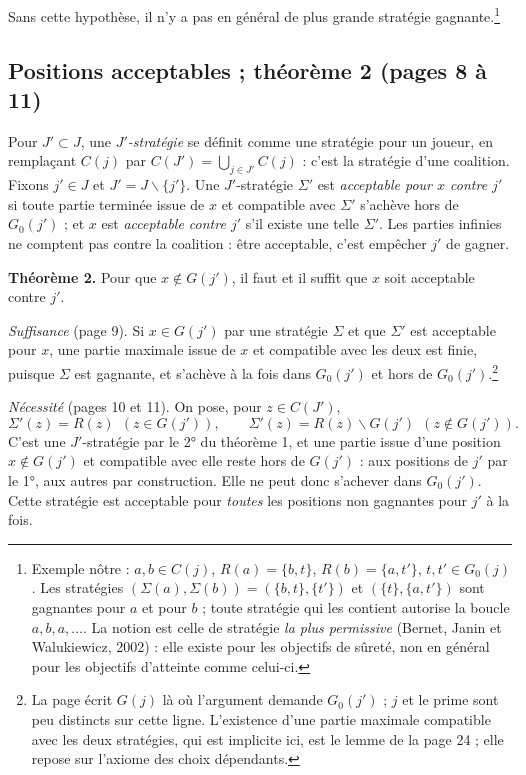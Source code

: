 \documentclass[11pt,a4paper]{article}
\begin{document}
Sans cette hypothèse, il n'y a pas en général de plus grande stratégie
gagnante.\footnote{Exemple nôtre : $a, b \in C(j)$, $R(a) = \{b, t\}$,
$R(b) = \{a, t'\}$, $t, t' \in G_0(j)$. Les stratégies
$(\Sigma(a), \Sigma(b)) = (\{b, t\}, \{t'\})$ et $(\{t\}, \{a, t'\})$ sont
gagnantes pour $a$ et pour $b$ ; toute stratégie qui les contient autorise la
boucle $a, b, a, \ldots$. La notion est celle de stratégie \emph{la plus
permissive} (Bernet, Janin et Walukiewicz, 2002) : elle existe pour les
objectifs de sûreté, non en général pour les objectifs d'atteinte comme
celui-ci.}

\subsection*{Positions acceptables ; théorème 2 (pages 8 à 11)}

Pour $J' \subset J$, une \emph{$J'$-stratégie} se définit comme une stratégie
pour un joueur, en remplaçant $C(j)$ par $C(J') = \bigcup_{j \in J'} C(j)$ :
c'est la stratégie d'une coalition. Fixons $j' \in J$ et
$J' = J \smallsetminus \{j'\}$. Une $J'$-stratégie $\Sigma'$ est
\emph{acceptable pour $x$ contre $j'$} si toute partie terminée issue de $x$
et compatible avec $\Sigma'$ s'achève hors de $G_0(j')$ ; et $x$ est
\emph{acceptable contre $j'$} s'il existe une telle $\Sigma'$. Les parties
infinies ne comptent pas contre la coalition : être acceptable, c'est
empêcher $j'$ de gagner.

\textbf{Théorème 2.} Pour que $x \notin G(j')$, il faut et il suffit que $x$
soit acceptable contre $j'$.

\emph{Suffisance} (page 9). Si $x \in G(j')$ par une stratégie $\Sigma$ et
que $\Sigma'$ est acceptable pour $x$, une partie maximale issue de $x$ et
compatible avec les deux est finie, puisque $\Sigma$ est gagnante, et
s'achève à la fois dans $G_0(j')$ et hors de $G_0(j')$.\footnote{La page écrit
$G(j)$ là où l'argument demande $G_0(j')$ ; $j$ et le prime sont peu
distincts sur cette ligne. L'existence d'une partie maximale compatible avec
les deux stratégies, qui est implicite ici, est le lemme de la page 24 ; elle
repose sur l'axiome des choix dépendants.}

\emph{Nécessité} (pages 10 et 11). On pose, pour $z \in C(J')$,
\[
\Sigma'(z) = R(z) \ \ (z \in G(j')),
\qquad
\Sigma'(z) = R(z) \smallsetminus G(j') \ \ (z \notin G(j')).
\]
C'est une $J'$-stratégie par le 2° du théorème 1, et une partie issue d'une
position $x \notin G(j')$ et compatible avec elle reste hors de $G(j')$ : aux
positions de $j'$ par le 1°, aux autres par construction. Elle ne peut donc
s'achever dans $G_0(j')$. Cette stratégie est acceptable pour \emph{toutes}
les positions non gagnantes pour $j'$ à la fois.
\end{document}
